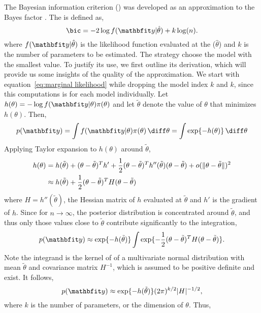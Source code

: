 The Bayesian information criterion (\bic) was developed as an approximation to
the Bayes factor \parencite{Schwarz:1978uv}. The \bic is defined as,
\begin{equation}
  \text{\bic} = -2\log f(\data|\hat\theta) + k\log(n).
\end{equation}
where $f(\data|\hat\theta)$ is the likelihood function evaluated at the \mle
($\hat\theta$) and $k$ is the number of parameters to be estimated. The \bic
strategy choose the model with the smallest \bic value. To justify its use, we
first outline its derivation, which will provide us some insights of the
quality of the approximation. We start with equation~\eqref{eq:marginal
  likelihood} while dropping the model index $k$ and $k$, since this
computations is for each model individually. Let $h(\theta) = - \log
f(\data|\theta)\pi(\theta)$ and let $\tilde\theta$ denote the value of $\theta$ that minimizes
$h(\theta)$. Then,
\begin{equation}
  p(\data) = \int f(\data|\theta)\pi(\theta)\intd\theta = \int\exp\{-h(\theta)\}\intd\theta
\end{equation}
Applying Taylor expansion to $h(\theta)$ around $\tilde\theta$,
\begin{align}
  h(\theta)
  &= h(\tilde\theta) + (\theta - \tilde\theta)^T h'
  + \frac{1}{2}(\theta - \tilde\theta)^T h''(\tilde\theta) (\theta - \tilde\theta)
  + o(\lVert \theta - \tilde\theta \rVert)^2 \notag\\
  &\approx h(\tilde\theta) + \frac{1}{2}(\theta - \tilde\theta)^T H (\theta - \tilde\theta)
\end{align}
where $H = h''(\tilde\theta)$, the Hessian matrix of $h$ evaluated at $\tilde\theta$ and
$h'$ is the gradient of $h$. Since for $n\to\infty$, the posterior
distribution is concentrated around $\tilde\theta$, and thus only those values close
to $\tilde\theta$ contribute significantly to the integration,
\begin{equation}
  p(\data)\approx\exp\{-h(\tilde\theta)\}
  \int\exp\{-\frac{1}{2}(\theta - \tilde\theta)^TH(\theta - \tilde\theta)\}.
\end{equation}
Note the integrand is the kernel of of a multivariate normal distribution with
mean $\tilde\theta$ and covariance matrix $H^{-1}$, which is assumed to be positive
definite and exist. It follows,
\begin{equation}
  p(\data) \approx \exp\{-h(\tilde\theta)\} (2\pi)^{k/2} \lvert H \rvert^{-1/2},
\end{equation}
where $k$ is the number of parameters, or the dimension of $\theta$. Thus,
